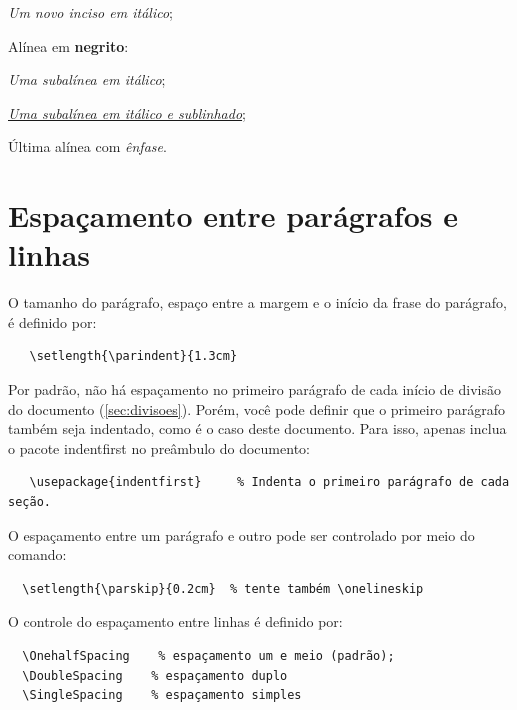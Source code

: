 \begin{alineas}
  \begin{incisos}
    \item \textit{Um novo inciso em itálico};
  \end{incisos}

  \item Alínea em \textbf{negrito}:

  \begin{subalineas}
    \item \textit{Uma subalínea em itálico};
    \item \underline{\textit{Uma subalínea em itálico e sublinhado}};
  \end{subalineas}

  \item Última alínea com \emph{ênfase}.

\end{alineas}

\section{Espaçamento entre parágrafos e linhas}%
O tamanho do parágrafo, espaço entre a margem
e o início da frase do parágrafo, é definido por:

\begin{verbatim}
   \setlength{\parindent}{1.3cm}
\end{verbatim}%
Por padrão, não há espaçamento no
primeiro parágrafo de cada início de divisão do documento
(\autoref{sec:divisoes}). Porém, você pode definir que o primeiro parágrafo
também seja indentado, como é o caso deste documento. Para isso, apenas inclua o
pacote \textsf{indentfirst} no preâmbulo do documento:

\begin{verbatim}
   \usepackage{indentfirst}     % Indenta o primeiro parágrafo de cada seção.
\end{verbatim}%
O espaçamento entre um parágrafo e outro
pode ser controlado por meio do comando:

\begin{verbatim}
  \setlength{\parskip}{0.2cm}  % tente também \onelineskip
\end{verbatim}%
O controle do espaçamento entre linhas é
definido por:

\begin{verbatim}
  \OnehalfSpacing    % espaçamento um e meio (padrão);
  \DoubleSpacing    % espaçamento duplo
  \SingleSpacing    % espaçamento simples
\end{verbatim}

